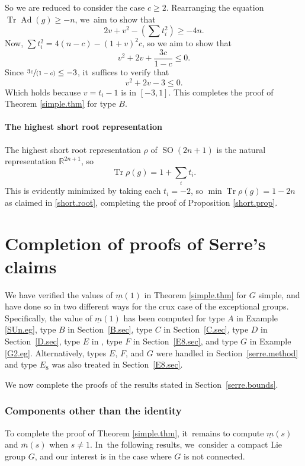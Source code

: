 \documentclass[JEP,XML,SOM,Unicode,NoFloatCountersInSection,published]{cedram}
\newcommand{\spfrac}[2]{\sfrac{#1}{(#2)}}
\theoremstyle{definition}
\newcommand{\R}{\mathbb{R}}
\newcommand{\mmin}{\underline{m}}
\newcommand{\mmax}{\overline{m}}
\DeclareMathOperator{\SO}{SO}
\DeclareMathOperator{\Tr}{Tr}
\DeclareMathOperator{\Ad}{Ad}
\begin{document}
So we are reduced to consider the case $c \ge 2$. Rearranging the equation $\Tr \Ad(g) \ge -n$, we~aim to show that
\[
2 v + v^2 - (\sum t_i^2) \ge -4n.
\]
Now, $\sum t_i^2 = 4(n-c) - (1+v)^2 c$, so we aim to show that
\[
v^2 + 2v + \frac{3c}{1-c} \le 0.
\]
Since $\spfrac{3c}{1-c} \le -3$, it~suffices to verify that
\[
v^2 + 2v - 3 \le 0.
\]
Which holds because $v = t_i - 1$ is in $[-3, 1]$. This completes the proof of Theorem \ref{simple.thm} for type $B$.

\subsection*{The highest short root representation}
The highest short root representation $\rho$ of $\SO(2n+1)$ is the natural representation $\R^{2n+1}$, so
\begin{equation} \label{B.rho}
\Tr \rho(g) = 1 + \sum_{i} t_i.
\end{equation}
This is evidently minimized by taking each $t_i = -2$, so $\min \Tr \rho(g) = 1 - 2n$ as claimed in \autoref{short.root}, completing the proof of Proposition \ref{short.prop}.

\part{Completion of proofs of Serre's claims} \label{completion.part}

We have verified the values of $\mmin(1)$ in Theorem \ref{simple.thm} for $G$ simple, and have done so in two different ways for the crux case of the exceptional groups. Specifically, the value of $\mmin(1)$ has been computed for type $A$ in Example \ref{SUn.eg}, type $B$ in Section~\ref{B.sec}, type $C$ in Section~\ref{C.sec}, type $D$ in Section~\ref{D.sec}, type $E$ in \cite[App.\,B]{DMMV}, type $F$ in Section~\ref{E8.sec}, and type $G$ in Example \ref{G2.eg}. Alternatively, types $E$, $F$, and $G$ were handled in Section~\ref{serre.method} and type $E_8$ was also treated in Section~\ref{E8.sec}.

We now complete the proofs of the results stated in Section~\ref{serre.bounds}.

\section{Components other than the identity} \label{outer.sec}

To complete the proof of Theorem \ref{simple.thm}, it~remains to compute $\mmin(s)$ and $\mmax(s)$ when $s \ne 1$. In~the following results, we~consider a compact Lie group $G$, and our interest is in the case where $G$ is not connected.
\end{document}

